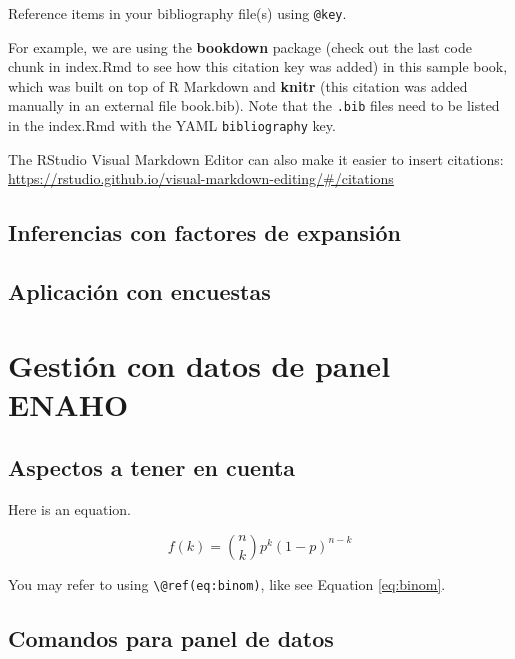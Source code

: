 \documentclass[
]{book}
\theoremstyle{definition}
\theoremstyle{definition}
\theoremstyle{definition}
\theoremstyle{definition}
\theoremstyle{remark}
\begin{document}
Reference items in your bibliography file(s) using \texttt{@key}.

For example, we are using the \textbf{bookdown} package \citep{R-bookdown} (check out the last code chunk in index.Rmd to see how this citation key was added) in this sample book, which was built on top of R Markdown and \textbf{knitr} \citep{xie2015} (this citation was added manually in an external file book.bib).
Note that the \texttt{.bib} files need to be listed in the index.Rmd with the YAML \texttt{bibliography} key.

The RStudio Visual Markdown Editor can also make it easier to insert citations: \url{https://rstudio.github.io/visual-markdown-editing/\#/citations}

\hypertarget{inferencias-con-factores-de-expansiuxf3n}{%
\section{Inferencias con factores de expansión}\label{inferencias-con-factores-de-expansiuxf3n}}

\hypertarget{aplicaciuxf3n-con-encuestas}{%
\section{Aplicación con encuestas}\label{aplicaciuxf3n-con-encuestas}}

\hypertarget{gestiuxf3n-con-datos-de-panel-enaho}{%
\chapter{Gestión con datos de panel ENAHO}\label{gestiuxf3n-con-datos-de-panel-enaho}}

\hypertarget{aspectos-a-tener-en-cuenta}{%
\section{Aspectos a tener en cuenta}\label{aspectos-a-tener-en-cuenta}}

Here is an equation.

\begin{equation} 
  f\left(k\right) = \binom{n}{k} p^k\left(1-p\right)^{n-k}
  \label{eq:binom}
\end{equation}

You may refer to using \texttt{\textbackslash{}@ref(eq:binom)}, like see Equation \eqref{eq:binom}.

\hypertarget{comandos-para-panel-de-datos}{%
\section{Comandos para panel de datos}\label{comandos-para-panel-de-datos}}
\end{document}
